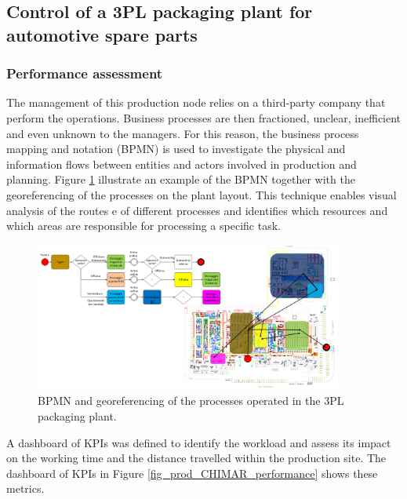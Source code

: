 \subsection{Control of a 3PL packaging plant for automotive spare parts}
\subsubsection{Performance assessment}

The management of this production node relies on a third-party company that perform the operations. Business processes are then fractioned, unclear, inefficient and even unknown to the managers. For this reason, the business process mapping and notation (BPMN)  is used to investigate the physical and information flows between entities and actors involved in production and planning. Figure \ref{fig_prod_CHIMAR_bpmn} illustrate an example of the BPMN together with the georeferencing of the processes on the plant layout. This technique enables visual analysis of the routes e of different processes and identifies which resources and which areas are responsible for processing a specific task. 

\begin{figure}[hbt!]
\centering
\includegraphics[width=0.9\textwidth]{sectionProduction/control_figures/fig_prod_CHIMAR_bpmn.png}
\captionsetup{type=figure}
\caption{BPMN and georeferencing of the processes operated in the 3PL packaging plant.}
\label{fig_prod_CHIMAR_bpmn}
\end{figure}

A dashboard of KPIs was defined to identify the workload and assess its impact on the working time and the distance travelled within the production site. The dashboard of KPIs in Figure \ref{fig_prod_CHIMAR_performance} shows these metrics.

